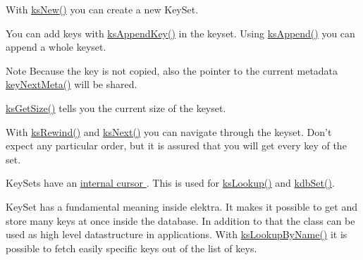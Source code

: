 With \hyperlink{group__keyset_ga671e1aaee3ae9dc13b4834a4ddbd2c3c}{ks\-New()} you can create a new Key\-Set.

You can add keys with \hyperlink{group__keyset_gaa5a1d467a4d71041edce68ea7748ce45}{ks\-Append\-Key()} in the keyset. Using \hyperlink{group__keyset_ga21eb9c3a14a604ee3a8bdc779232e7b7}{ks\-Append()} you can append a whole keyset.

\begin{DoxyNote}{Note}
Because the key is not copied, also the pointer to the current metadata \hyperlink{group__keymeta_ga4c88342f580a4291455a801af71ce048}{key\-Next\-Meta()} will be shared. 
\end{DoxyNote}


\hyperlink{group__keyset_ga7474ad6b0a0fa969dbdf267ba5770eee}{ks\-Get\-Size()} tells you the current size of the keyset.

With \hyperlink{group__keyset_gabe793ff51f1728e3429c84a8a9086b70}{ks\-Rewind()} and \hyperlink{group__keyset_ga317321c9065b5a4b3e33fe1c399bcec9}{ks\-Next()} you can navigate through the keyset. Don't expect any particular order, but it is assured that you will get every key of the set.

Key\-Sets have an \hyperlink{group__keyset_ga4287b9416912c5f2ab9c195cb74fb094}{internal cursor }. This is used for \hyperlink{group__keyset_gaa34fc43a081e6b01e4120daa6c112004}{ks\-Lookup()} and \hyperlink{group__kdb_ga11436b058408f83d303ca5e996832bcf}{kdb\-Set()}.

Key\-Set has a fundamental meaning inside elektra. It makes it possible to get and store many keys at once inside the database. In addition to that the class can be used as high level datastructure in applications. With \hyperlink{group__keyset_gad2e30fb6d4739d917c5abb2ac2f9c1a1}{ks\-Lookup\-By\-Name()} it is possible to fetch easily specific keys out of the list of keys.

